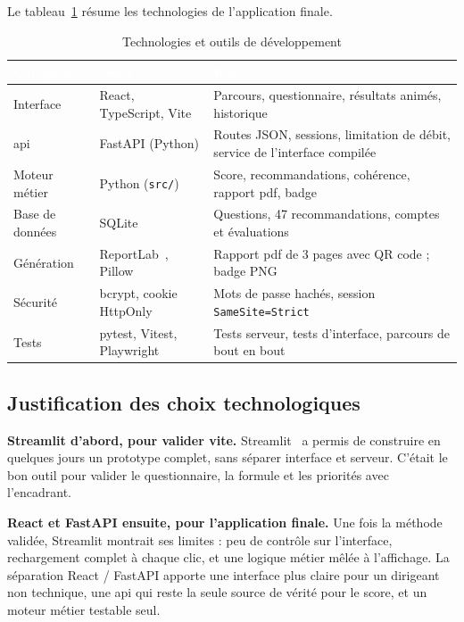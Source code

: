 Le tableau~\ref{tab:technologies} résume les technologies de l'application finale.

\begin{table}[H]
  \centering
  \caption{Technologies et outils de développement}
  \label{tab:technologies}
  \renewcommand{\arraystretch}{1.4}
  \begin{tabularx}{\textwidth}{|>{\centering\arraybackslash}m{3.2cm}|l|X|}
    \hline
    \rowcolor{iacsTableHead}
    \textcolor{white}{\textbf{Catégorie}} &
    \textcolor{white}{\textbf{Outil}} &
    \textcolor{white}{\textbf{Rôle}} \\
    \hline
    Interface & React, TypeScript, Vite & Parcours, questionnaire, résultats animés, historique \\
    \hline
    \rowcolor{iacsLightGray}
    \gls{api} & FastAPI (Python) & Routes JSON, sessions, limitation de débit, service de l'interface compilée \\
    \hline
    Moteur métier & Python (\texttt{src/}) & Score, recommandations, cohérence, rapport \gls{pdf}, badge \\
    \hline
    \rowcolor{iacsLightGray}
    Base de données & SQLite & Questions, 47 recommandations, comptes et évaluations \\
    \hline
    Génération & ReportLab~\cite{reportlab}, Pillow & Rapport \gls{pdf} de 3 pages avec QR code ; badge PNG \\
    \hline
    \rowcolor{iacsLightGray}
    Sécurité & bcrypt, cookie HttpOnly & Mots de passe hachés, session \texttt{SameSite=Strict} \\
    \hline
    Tests & pytest, Vitest, Playwright & Tests serveur, tests d'interface, parcours de bout en bout \\
    \hline
  \end{tabularx}
\end{table}

\subsection{Justification des choix technologiques}

\textbf{Streamlit d'abord, pour valider vite.} Streamlit~\cite{streamlit} a permis de construire en quelques jours un prototype complet, sans séparer interface et serveur. C'était le bon outil pour valider le questionnaire, la formule et les priorités avec l'encadrant.

\textbf{React et FastAPI ensuite, pour l'application finale.} Une fois la méthode validée, Streamlit montrait ses limites : peu de contrôle sur l'interface, rechargement complet à chaque clic, et une logique métier mêlée à l'affichage. La séparation React / FastAPI apporte une interface plus claire pour un dirigeant non technique, une \gls{api} qui reste la seule source de vérité pour le score, et un moteur métier testable seul.

